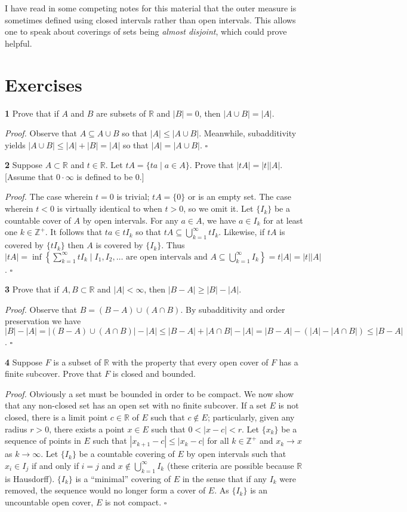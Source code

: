 \documentclass[a4paper]{article}
\newcommand{\R}{\mathbb{R}}
\newcommand{\Z}{\mathbb{Z}}
\begin{document}
I have read in some competing notes for this material that the outer measure is sometimes defined using closed intervals rather than open intervals. This allows one to speak about coverings of sets being \emph{almost disjoint}, which could prove helpful.

\section*{Exercises}

\textbf{1} Prove that if $A$ and $B$ are subsets of $\R$ and $|B| = 0$, then $|A \cup B| = |A|$.

\emph{Proof.} Observe that $A \subseteq A \cup B$ so that $|A| \leq |A \cup B|$. Meanwhile, subadditivity yields $|A \cup B| \leq |A| + |B| = |A|$ so that $|A| = |A \cup B|$. $\square$

\textbf{2} Suppose $A \subset \R$ and $t \in \R$. Let $tA = \{ta \mid a \in A\}$. Prove that $|tA| = |t||A|$. [Assume that $0 \cdot \infty$ is defined to be $0$.]

\emph{Proof.} The case wherein $t = 0$ is trivial; $tA = \{0\}$ or is an empty set. The case wherein $t < 0$ is virtually identical to when $t > 0$, so we omit it. Let $\{I_k\}$ be a countable cover of $A$ by open intervals. For any $a \in A$, we have $a \in I_k$ for at least one $k \in \Z^+$. It follows that $ta \in tI_k$ so that $tA \subseteq \bigcup_{k=1}^\infty tI_k$. Likewise, if $tA$ is covered by $\{tI_k\}$ then $A$ is covered by $\{I_k\}$. Thus $|tA| = \inf\left\{\sum_{k=1}^\infty tI_k \mid I_1, I_2, \ldots \text{ are open intervals and } A \subseteq \bigcup_{k=1}^\infty I_k\right\} = t|A| = |t||A|$. $\square$

\textbf{3} Prove that if $A, B \subset \R$ and $|A| < \infty$, then $|B - A| \geq |B| - |A|$.

\emph{Proof.} Observe that $B = (B - A) \cup (A \cap B)$. By subadditivity and order preservation we have $|B| - |A| = |(B - A) \cup (A \cap B)| - |A| \leq |B - A| + |A \cap B| - |A| = |B - A| - (|A| - |A \cap B|) \leq |B - A|$. $\square$

\textbf{4} Suppose $F$ is a subset of $\R$ with the property that every open cover of $F$ has a finite subcover. Prove that $F$ is closed and bounded.

\emph{Proof.} Obviously a set must be bounded in order to be compact. We now show that any non-closed set has an open set with no finite subcover. If a set $E$ is not closed, there is a limit point $c \in \R$ of $E$ such that $c \notin E$; particularly, given any radius $r > 0$, there exists a point $x \in E$ such that $0 < |x - c| < r$. Let $\{x_k\}$ be a sequence of points in $E$ such that $|x_{k+1} - c| \leq |x_k - c|$ for all $k \in \Z^+$ and $x_k \to x$ as $k \to \infty$. Let $\{I_k\}$ be a countable covering of $E$ by open intervals such that $x_i \in I_j$ if and only if $i = j$ and $x \notin \bigcup_{k=1}^\infty I_k$ (these criteria are possible because $\R$ is Hausdorff). $\{I_k\}$ is a ``minimal'' covering of $E$ in the sense that if any $I_k$ were removed, the sequence would no longer form a cover of $E$. As $\{I_k\}$ is an uncountable open cover, $E$ is not compact. $\square$
\end{document}
